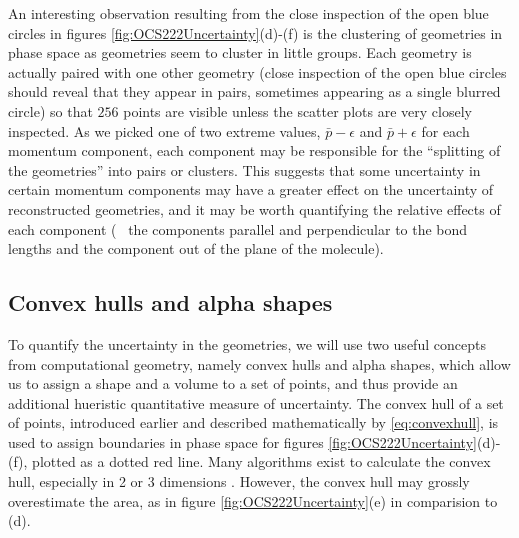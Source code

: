 An interesting observation resulting from the close inspection of the open blue circles in figures \ref{fig:OCS222Uncertainty}(d)-(f) is the clustering of geometries in phase space as geometries seem to cluster in little groups. Each geometry is actually paired with one other geometry (close inspection of the open blue circles should reveal that they appear in pairs, sometimes appearing as a single blurred circle) so that $256$ points are visible unless the scatter plots are very closely inspected. As we picked one of two extreme values, $\bar{p} - \epsilon$ and $\bar{p} + \epsilon$ for each momentum component, each component may be responsible for the ``splitting of the geometries'' into pairs or clusters. This suggests that some uncertainty in certain momentum components may have a greater effect on the uncertainty of reconstructed geometries, and it may be worth quantifying the relative effects of each component (\eg~ the components parallel and perpendicular to the bond lengths and the component out of the plane of the molecule).

\subsection{Convex hulls and alpha shapes}
To quantify the uncertainty in the geometries, we will use two useful concepts from computational geometry, namely convex hulls and alpha shapes, which allow us to assign a shape and a volume to a set of points, and thus provide an additional hueristic quantitative measure of uncertainty. The convex hull of a set of points, introduced earlier and described mathematically by \eqref{eq:convexhull}, is used to assign boundaries in phase space for figures \ref{fig:OCS222Uncertainty}(d)-(f), plotted as a dotted red line. Many algorithms exist to calculate the convex hull, especially in 2 or 3 dimensions \citep[ch. 11]{deBerg08}. However, the convex hull may grossly overestimate the area, as in figure \ref{fig:OCS222Uncertainty}(e) in comparision to (d).

